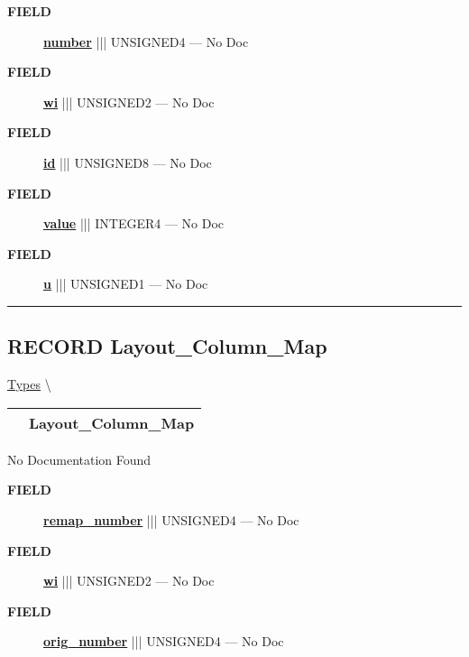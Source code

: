 \par
\begin{description}
\item [\colorbox{tagtype}{\color{white} \textbf{\textsf{FIELD}}}] \textbf{\underline{number}} ||| UNSIGNED4 --- No Doc
\item [\colorbox{tagtype}{\color{white} \textbf{\textsf{FIELD}}}] \textbf{\underline{wi}} ||| UNSIGNED2 --- No Doc
\item [\colorbox{tagtype}{\color{white} \textbf{\textsf{FIELD}}}] \textbf{\underline{id}} ||| UNSIGNED8 --- No Doc
\item [\colorbox{tagtype}{\color{white} \textbf{\textsf{FIELD}}}] \textbf{\underline{value}} ||| INTEGER4 --- No Doc
\item [\colorbox{tagtype}{\color{white} \textbf{\textsf{FIELD}}}] \textbf{\underline{u}} ||| UNSIGNED1 --- No Doc
\end{description}





\rule{\linewidth}{0.5pt}
\subsection*{\textsf{\colorbox{headtoc}{\color{white} RECORD}
Layout\_Column\_Map}}

\hypertarget{ecldoc:logisticregression.types.layout_column_map}{}
\hspace{0pt} \hyperlink{ecldoc:LogisticRegression.Types}{Types} \textbackslash 

{\renewcommand{\arraystretch}{1.5}
\begin{tabularx}{\textwidth}{|>{\raggedright\arraybackslash}l|X|}
\hline
\hspace{0pt}\mytexttt{\color{red} } & \textbf{Layout\_Column\_Map} \\
\hline
\end{tabularx}
}

\par





No Documentation Found







\par
\begin{description}
\item [\colorbox{tagtype}{\color{white} \textbf{\textsf{FIELD}}}] \textbf{\underline{remap\_number}} ||| UNSIGNED4 --- No Doc
\item [\colorbox{tagtype}{\color{white} \textbf{\textsf{FIELD}}}] \textbf{\underline{wi}} ||| UNSIGNED2 --- No Doc
\item [\colorbox{tagtype}{\color{white} \textbf{\textsf{FIELD}}}] \textbf{\underline{orig\_number}} ||| UNSIGNED4 --- No Doc
\end{description}





